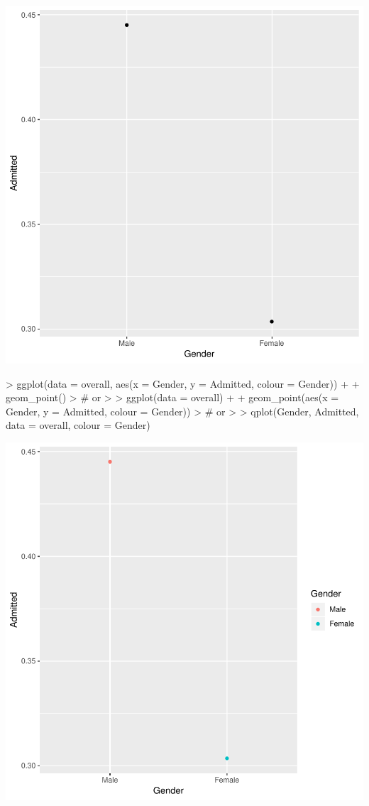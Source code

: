 \documentclass[12pt,letterpaper,final]{article}
\begin{document}
\includegraphics{lect_main-027}

\begin{Schunk}
\begin{Sinput}
> ggplot(data = overall, aes(x = Gender, y = Admitted, colour = Gender)) +
+   geom_point()
> # or
> 
> ggplot(data = overall) +
+   geom_point(aes(x = Gender, y = Admitted, colour = Gender))
> # or
> 
> qplot(Gender, Admitted, data = overall, colour = Gender)
\end{Sinput}
\end{Schunk}
\includegraphics{lect_main-028}
\end{document}
